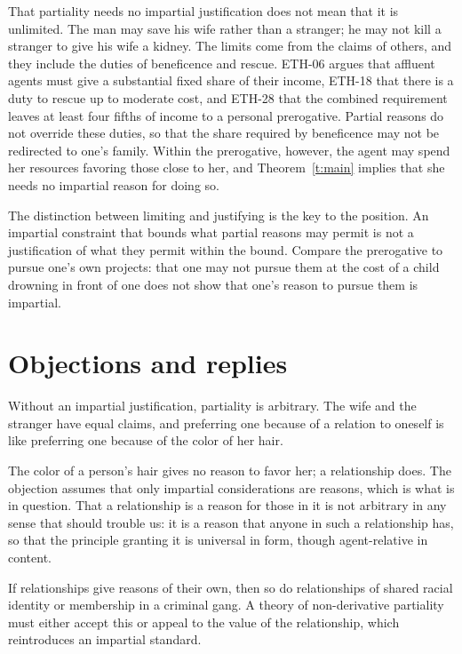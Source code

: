 \documentclass{situationist-preprint}
\begin{document}
That partiality needs no impartial justification does not mean that it is unlimited. The man may save his wife rather than a stranger; he may not kill a stranger to give his wife a kidney. The limits come from the claims of others, and they include the duties of beneficence and rescue. ETH-06 argues that affluent agents must give a substantial fixed share of their income, ETH-18 that there is a duty to rescue up to moderate cost, and ETH-28 that the combined requirement leaves at least four fifths of income to a personal prerogative. Partial reasons do not override these duties, so that the share required by beneficence may not be redirected to one's family. Within the prerogative, however, the agent may spend her resources favoring those close to her, and Theorem~\ref{t:main} implies that she needs no impartial reason for doing so.

The distinction between limiting and justifying is the key to the position. An impartial constraint that bounds what partial reasons may permit is not a justification of what they permit within the bound. Compare the prerogative to pursue one's own projects: that one may not pursue them at the cost of a child drowning in front of one does not show that one's reason to pursue them is impartial.

\section{Objections and replies}

\begin{objection}[Arbitrariness]\label{o:arb}
Without an impartial justification, partiality is arbitrary. The wife and the stranger have equal claims, and preferring one because of a relation to oneself is like preferring one because of the color of her hair.
\end{objection}

\begin{reply}
The color of a person's hair gives no reason to favor her; a relationship does. The objection assumes that only impartial considerations are reasons, which is what is in question. That a relationship is a reason for those in it is not arbitrary in any sense that should trouble us: it is a reason that anyone in such a relationship has, so that the principle granting it is universal in form, though agent-relative in content.
\end{reply}

\begin{objection}\label{o:bad}
If relationships give reasons of their own, then so do relationships of shared racial identity or membership in a criminal gang. A theory of non-derivative partiality must either accept this or appeal to the value of the relationship, which reintroduces an impartial standard.
\end{objection}
\end{document}
